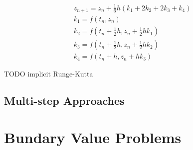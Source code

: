\documentclass[letterpaper, 11pt]{article}
\begin{document}
\begin{subequations}
\begin{align}
\label{eq:ivp-rk-4-stage}
& z_{n+1} = z_{n} + \frac{1}{6}h \left( k_{1} + 2k_{2} + 2k_{3} + k_{4} \right) \\
& k_{1} = f \left( t_{n}, z_{n} \right) \\
& k_{2} = f \left( t_{n} + \frac{1}{2}h, z_{n} + \frac{1}{2}hk_{1} \right) \\
& k_{3} = f \left( t_{n} + \frac{1}{2}h, z_{n} + \frac{1}{2}hk_{2} \right) \\
& k_{4} = f \left( t_{n} + h, z_{n} + hk_{3} \right) 
\end{align}
\end{subequations}


TODO implicit Runge-Kutta

\subsection{Multi-step Approaches}
\label{sec-1-4}
\section{Bundary Value Problems}
\label{sec-2}



\end{document}
